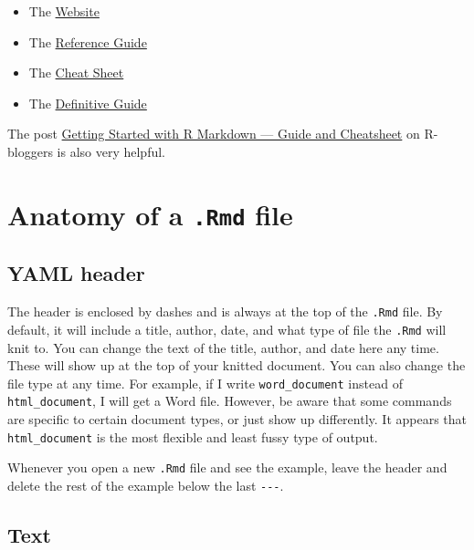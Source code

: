 \documentclass[
]{article}
\providecommand{\tightlist}{%
  \setlength{\itemsep}{0pt}\setlength{\parskip}{0pt}}
\begin{document}
\begin{itemize}
\tightlist
\item
  The \href{https://rmarkdown.rstudio.com/lesson-1.html}{Website}
\item
  The
  \href{https://rstudio.com/wp-content/uploads/2015/03/rmarkdown-reference.pdf}{Reference
  Guide}
\item
  The
  \href{https://github.com/rstudio/cheatsheets/raw/master/rmarkdown-2.0.pdf}{Cheat
  Sheet}
\item
  The \href{https://bookdown.org/yihui/rmarkdown/}{Definitive Guide}
\end{itemize}

The post
\href{https://www.r-bloggers.com/2020/07/getting-started-with-r-markdown-guide-and-cheatsheet/}{Getting
Started with R Markdown --- Guide and Cheatsheet} on R-bloggers is also
very helpful.

\hypertarget{anatomy-of-a-.rmd-file}{%
\section{\texorpdfstring{Anatomy of a \texttt{.Rmd}
file}{Anatomy of a .Rmd file}}\label{anatomy-of-a-.rmd-file}}

\hypertarget{yaml-header}{%
\subsection{YAML header}\label{yaml-header}}

The header is enclosed by dashes and is always at the top of the
\texttt{.Rmd} file. By default, it will include a title, author, date,
and what type of file the \texttt{.Rmd} will knit to. You can change the
text of the title, author, and date here any time. These will show up at
the top of your knitted document. You can also change the file type at
any time. For example, if I write \texttt{word\_document} instead of
\texttt{html\_document}, I will get a Word file. However, be aware that
some commands are specific to certain document types, or just show up
differently. It appears that \texttt{html\_document} is the most
flexible and least fussy type of output.

Whenever you open a new \texttt{.Rmd} file and see the example, leave
the header and delete the rest of the example below the last
\texttt{-\/-\/-}.

\hypertarget{text}{%
\subsection{Text}\label{text}}
\end{document}
